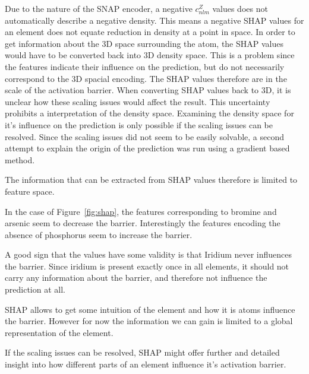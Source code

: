 Due to the nature of the SNAP encoder, a negative $c_{nlm}^Z$ values does not automatically 
describe a negative density.
This means a negative SHAP values for an element does not equate reduction in density
at a point in space.
In order to get information about the 3D space surrounding the atom, the SHAP values would have to be converted back into 3D density space.
This is a problem since the features indicate their influence on the prediction, but do not necessarily correspond 
to the 3D spacial encoding.
The SHAP values therefore are in the scale of the activation barrier.
When converting SHAP values back to 3D, it is unclear how these scaling issues would 
affect the result. 
This uncertainty prohibits a interpretation of the density space.
Examining the density space for it's influence on the prediction is only possible if the scaling
issues can be resolved.
Since the scaling issues did not seem to be easily solvable, a second attempt to explain the origin of the prediction
was run using a gradient based method.

The information that can be extracted from SHAP values therefore is limited to feature space.

In the case of Figure~\ref{fig:shap}, the features corresponding to bromine and arsenic seem to decrease the barrier.
Interestingly the features encoding the absence of phosphorus seem to increase the barrier.

A good sign that the values have some validity is that Iridium never influences the barrier.
Since iridium is present exactly once in all elements, it should not carry any information about the barrier,
and therefore not influence the prediction at all.

SHAP allows to get some intuition of the element and how it is atoms influence the barrier.
However for now the information we can gain is limited to a global representation of the element.

If the scaling issues can be resolved, SHAP might offer further and detailed insight into how different parts of an element influence it's activation barrier.

